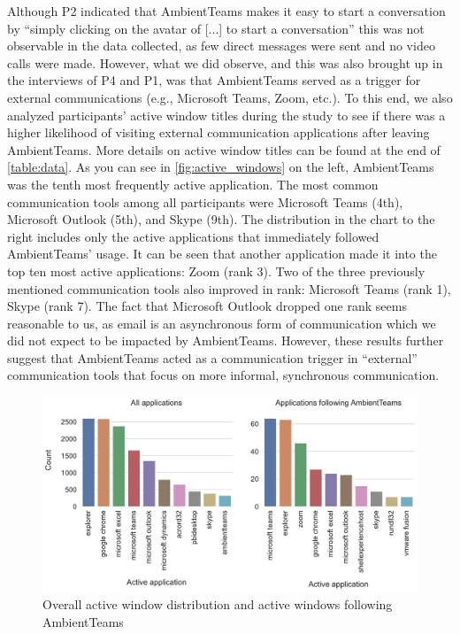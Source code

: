 Although P2 indicated that AmbientTeams makes it easy to start a conversation by \enquote{simply clicking on the avatar of [...] to start a conversation} this was not observable in the data collected, as few direct messages were sent and no video calls were made. However, what we did observe, and this was also brought up in the interviews of P4 and P1, was that AmbientTeams served as a trigger for external communications (e.g., Microsoft Teams, Zoom, etc.). To this end, we also analyzed participants' active window titles during the study to see if there was a higher likelihood of visiting external communication applications after leaving AmbientTeams. More details on active window titles can be found at the end of \autoref{table:data}. As you can see in \autoref{fig:active_windows} on the left, AmbientTeams was the tenth most frequently active application. The most common communication tools among all participants were Microsoft Teams (4th), Microsoft Outlook (5th), and Skype (9th). The distribution in the chart to the right includes only the active applications that immediately followed AmbientTeams' usage. It can be seen that another application made it into the top ten most active applications: Zoom (rank 3). Two of the three previously mentioned communication tools also improved in rank: Microsoft Teams (rank 1), Skype (rank 7). The fact that Microsoft Outlook dropped one rank seems reasonable to us, as email is an asynchronous form of communication which we did not expect to be impacted by AmbientTeams. However, these results further suggest that AmbientTeams acted as a communication trigger in \enquote{external} communication tools that focus on more informal, synchronous communication.

\begin{figure}[h]
    \centering
    \includegraphics[width=.7\linewidth]{plots/active_windows.pdf}
    \caption{Overall active window distribution and active windows following AmbientTeams}
    \label{fig:active_windows}
\end{figure}



